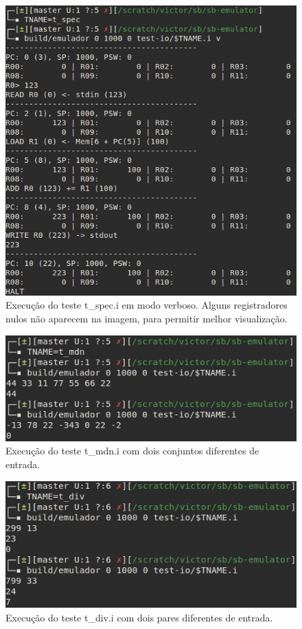 \documentclass[10pt,a4paper]{article}
\numberwithin{equation}{section}
\begin{document}
\begin{figure}[h]
    \includegraphics[scale=0.65]{imagens/t_spec_verbose_console.png}
    \centering
    \caption{Execução do teste t\_spec.i em modo verboso. Alguns registradores nulos não aparecem na imagem, para permitir melhor visualização.}
\end{figure}

\begin{figure}[h]
    \includegraphics[scale=0.65]{imagens/t_med_console.png}
    \centering
    \caption{Execução do teste t\_mdn.i com dois conjuntos diferentes de entrada.}
\end{figure}

\begin{figure}[h]
    \includegraphics[scale=0.65]{imagens/t_div_console.png}
    \centering
    \caption{Execução do teste t\_div.i com dois pares diferentes de entrada.}
\end{figure}
\end{document}
